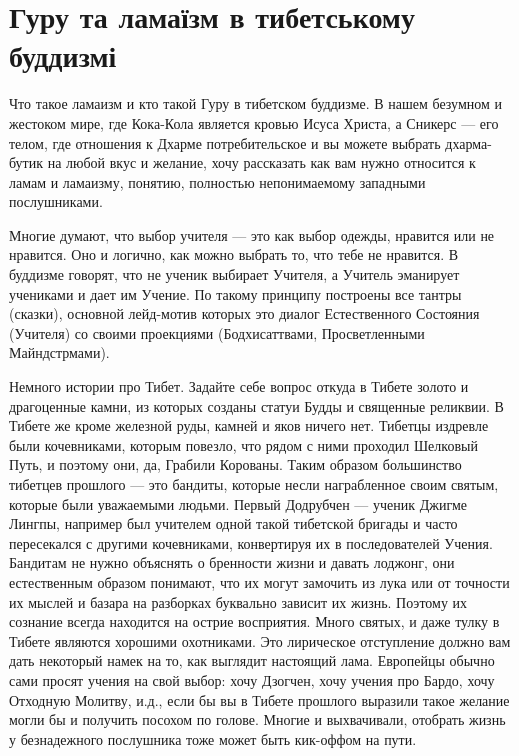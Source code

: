 \section{Гуру та ламаїзм в тибетському буддизмі}

Что такое ламаизм и кто такой Гуру в тибетском буддизме. В нашем безумном и жестоком мире, где Кока-Кола является кровью Исуса Христа, а Сникерс — его телом, где отношения к Дхарме потребительское и вы можете выбрать дхарма-бутик на любой вкус и желание, хочу рассказать как вам нужно относится к ламам и ламаизму, понятию, полностью непонимаемому западными послушниками.

Многие думают, что выбор учителя — это как выбор одежды, нравится или не нравится. Оно и логично, как можно выбрать то, что тебе не нравится. В буддизме говорят, что не ученик выбирает Учителя, а Учитель эманирует учениками и дает им Учение. По такому принципу построены все тантры (сказки), основной лейд-мотив которых это диалог Естественного Состояния (Учителя) со своими проекциями (Бодхисаттвами, Просветленными Майндстрмами).

Немного истории про Тибет. Задайте себе вопрос откуда в Тибете золото и драгоценные камни, из которых созданы статуи Будды и священные реликвии. В Тибете же кроме железной руды, камней и яков ничего нет. Тибетцы издревле были кочевниками, которым повезло, что рядом с ними проходил Шелковый Путь, и поэтому они, да, Грабили Корованы. Таким образом большинство тибетцев прошлого — это бандиты, которые несли награбленное своим святым, которые были уважаемыми людьми. Первый Додрубчен — ученик Джигме Лингпы, например был учителем одной такой тибетской бригады и часто пересекался с другими кочевниками, конвертируя их в последователей Учения. Бандитам не нужно объяснять о бренности жизни и давать лоджонг, они естественным образом понимают, что их могут замочить из лука или от точности их мыслей и базара на разборках буквально зависит их жизнь. Поэтому их сознание всегда находится на острие восприятия. Много святых, и даже тулку в Тибете являются хорошими охотниками. Это лирическое отступление должно вам дать некоторый намек на то, как выглядит настоящий лама. Европейцы обычно сами просят учения на свой выбор: хочу Дзогчен, хочу учения про Бардо, хочу Отходную Молитву, и.д., если бы вы в Тибете прошлого выразили такое желание могли бы и получить посохом по голове. Многие и выхвачивали, отобрать жизнь у безнадежного послушника тоже может быть кик-оффом на пути.

